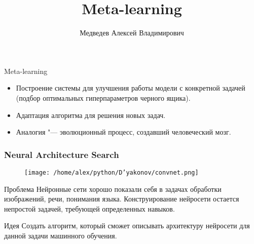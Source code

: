 \documentclass[fleqn, xcolor=x11names]{beamer}
\title{Meta-learning}
\author[Медведев~Д.\,В.]{Медведев Алексей Владимирович}
\institute[ВМК МГУ]{МГУ имени М. В. Ломоносова,
факультет ВМК, кафедра ММП}
\date{}
\begin{document}
\begin{frame}
\maketitle
\end{frame}

\begin{frame}
\begin{block}{Meta-learning}
\begin{itemize}

\item Построение системы для улучшения работы модели с конкретной задачей (подбор оптимальных гиперпараметров черного ящика).

\item Адаптация алгоритма для решения новых задач.

\item Аналогия "--- эволюционный процесс, создавший человеческий мозг.
\end{itemize}
\end{block}
\end{frame}



\begin{frame}[fragile]\frametitle{Neural Architecture Search}
{\footnotesize

\begin{figure}[h]
\begin{center}
\texttt{[image: /home/alex/python/D'yakonov/convnet.png]}
\end{center}
\end{figure}

\begin{block}{Проблема}
Нейронные сети хорошо показали себя в задачах обработки изображений, речи, понимания языка. Конструирование нейросети остается непростой задачей, требующей определенных навыков.

\end{block}

\begin{block}{Идея}
Создать алгоритм, который сможет описывать архитектуру нейросети для данной задачи машинного обучения.

\end{block}



}
\end{frame}
\end{document}
